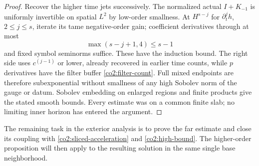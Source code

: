 \begin{proof}
Recover the higher time jets successively.  The normalized actual
$I+K_{-1}$ is uniformly invertible on spatial $L^2$ by low-order smallness.
At $H^{s-j}$ for $\partial_t^jh$, $2\le j\le s$, iterate its tame
negative-order gain; coefficient derivatives through at most
\[
 \max(s-j+1,4)\le s-1
\]
and fixed symbol seminorms suffice.  These have the induction bound.
The right side uses $c^{(j-1)}$ or lower, already recovered in earlier
time counts, while $p$ derivatives have the filter buffer
\eqref{co2:filter-count}.  Full mixed endpoints are therefore subexponential
without smallness of any high Sobolev norm of the gauge or datum.  Sobolev
embedding on enlarged regions and finite products give the stated smooth
bounds.  Every estimate was on a common finite slab; no limiting inner
horizon has entered the argument.
\end{proof}

The remaining task in the exterior analysis is to prove the far estimate and
close its coupling with \eqref{co2:sliced-acceleration} and
\eqref{co2:high-bound}.  The higher-order proposition will then apply to the
resulting solution in the same single base neighborhood.

